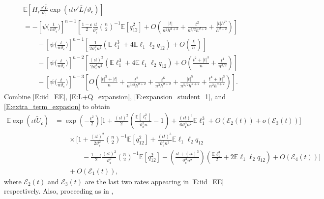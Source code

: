 \documentclass[11pt]{article}
\numberwithin{equation}{section}
\theoremstyle{definition}
\newcommand{\E}{\mathbb{E}}
\newcommand{\Scale}{\vartheta}
\begin{document}
\begin{align}\label{E:extra_term_expasion}
    &\E \left[H_\mathfrak{c}\tfrac{\nu'\bar{L}}{\Scale_\mathfrak{c}}\exp(\iota t \nu'\bar{L}/\Scale_\mathfrak{c})\right]\\
    & = -[\psi\big(\tfrac{t}{n\Scale_\mathfrak{c}}\big)]^{n-1}\left[ \frac{1-\mathfrak{c}}{2} \frac{\iota t }{\vartheta_\mathfrak{c}^2} \binom{n}{2}^{-1}\E[q_{12}^2] 
          + O\left(\tfrac{|t|}{n^{2}h^{d+2}} + \tfrac{t^2}{n^{3/2}h^{d+2}} + \tfrac{|t|h^P}{h^{d+2}}\right)\right]\nonumber\\
    &\qquad -[\psi\big(\tfrac{t}{n\Scale_\mathfrak{c}}\big)]^{n-1}\left[\frac{1}{2\Scale_\mathfrak{c}^3 n^2}(\E\ell_1^3 + 4\E\ell_1\ell_2 q_{12})         
          + O\left(\tfrac{|t|}{n} \right)\right]\nonumber\\
   &\qquad -[\psi\big(\tfrac{t}{n\Scale_\mathfrak{c}}\big)]^{n-2}\left[\frac{(\iota t)^2}{2\Scale_\mathfrak{c}^3 n^2}(\E\ell_1^3 + 4\E\ell_1\ell_2 q_{12}) +O\left(\tfrac{t^2 + |t|^3}{n} +\tfrac{t^4}{n^{3/2}} \right)\right] \nonumber\\
      &\qquad -[\psi\big(\tfrac{t}{n\Scale_\mathfrak{c}}\big)]^{n-3}\left[O\left(\tfrac{|t|^3 + |t|}{n} +\tfrac{t^2}{n^{3/2}h^{d+2}}  +\tfrac{t^6}{n^{3}h^{d+2}} + \tfrac{|t|^5}{n^{5/2}h^{d+2}} +\tfrac{t^4 + |t|^3}{n^{2}h^{d+2}} \right)\right].
\end{align}
Combine \eqref{E:iid_EE}, \eqref{E:L+Q_expansion}, \eqref{E:expansion_student_1}, and \eqref{E:extra_term_expasion} to obtain
\begin{align}\label{E:expansion_studdent_2}
     \E\exp( \iota t \widetilde{U}_\mathfrak{c})
     &= \exp\left(-\tfrac{t^2}{2}\right)\Big[1 + \frac{(\iota t)^2}{2}\left(\tfrac{\E[\ell_1^2]}{\Scale_\mathfrak{c}^2 n}-1\right) +\frac{(\iota t)^3}{6\Scale_\mathfrak{c}^3n^2}\E \ell_1^3  + O(\mathcal{E}_2(t)) + o(\mathcal{E}_3(t))\Big] \nonumber \\
    &\qquad \times\Big[1 + \frac{(\iota t)^2}{2\Scale_\mathfrak{c}^2} \binom{n}{2}^{-1}\E [q_{12}^2] + \frac{(\iota t)^3}{\Scale_\mathfrak{c}^3 n^2}\E\ell_1\ell_2q_{12} \nonumber\\
    &\qquad\qquad -\frac{1-\mathfrak{c}}{2} \frac{(\iota t)^2}{\vartheta_\mathfrak{c}^2} \binom{n}{2}^{-1}\E [q_{12}^2] - \left(\frac{\iota t + (\iota t)^3}{\vartheta_\mathfrak{c}^3n^2}\right)\left(\frac{\E\ell_1^3}{2} + 2\E\ell_1\ell_2 q_{12}\right) + O(\mathcal{E}_4(t))\Big]\nonumber\\
    &\qquad + O(\mathcal{E}_1(t)),
\end{align}
where $\mathcal{E}_2(t)$ and $\mathcal{E}_3(t)$ are the last two rates appearing in \eqref{E:iid_EE} respectively. Also, proceeding as in \citet{Nishiyama-Robinson_2001_ChBook},
\end{document}
